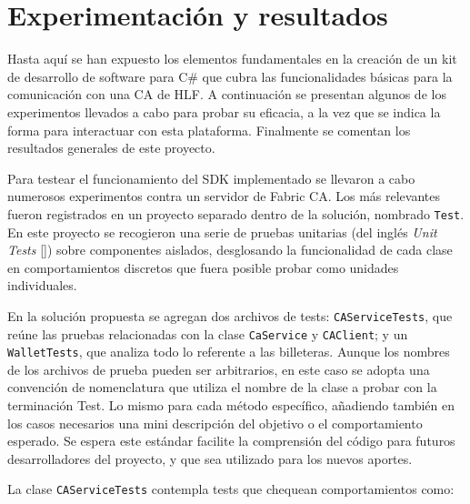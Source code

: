 \chapter{Experimentaci\'on y resultados}\label{chapter:implementation}
Hasta aqu\'i se han expuesto los elementos fundamentales en la creaci\'on de un kit de desarrollo de software para C\# que cubra las funcionalidades b\'asicas para la comunicaci\'on con una CA de HLF. A continuaci\'on se presentan algunos de los experimentos llevados a cabo para probar su eficacia, a la vez que se indica la forma para interactuar con esta plataforma. Finalmente se comentan los resultados generales de este proyecto.

Para testear el funcionamiento del SDK implementado se llevaron a cabo numerosos experimentos contra un servidor de Fabric CA. Los m\'as relevantes fueron registrados en un proyecto separado dentro de la soluci\'on, nombrado \texttt{Test}. En este proyecto se recogieron una serie de pruebas unitarias (del ingl\'es \emph{Unit Tests} [\cite{unittestvs}]) sobre componentes aislados, desglosando la funcionalidad de cada clase en comportamientos discretos que fuera posible probar como unidades individuales.

En la soluci\'on propuesta se agregan dos archivos de tests: \texttt{CAServiceTests}, que re\'une las pruebas relacionadas con la clase \texttt{CaService} y \texttt{CAClient}; y un \texttt{WalletTests}, que analiza todo lo referente a las billeteras. Aunque los nombres de los archivos de prueba pueden ser arbitrarios, en este caso se adopta una convención de nomenclatura que utiliza el nombre de la clase a probar con la terminaci\'on Test. Lo mismo para cada m\'etodo espec\'ifico, a\~nadiendo tambi\'en en los casos necesarios una mini descripci\'on del objetivo o el comportamiento esperado. Se espera este estándar facilite la comprensi\'on del c\'odigo para futuros desarrolladores del proyecto, y que sea utilizado para los nuevos aportes.

La clase \texttt{CAServiceTests} contempla tests que chequean comportamientos como: 

